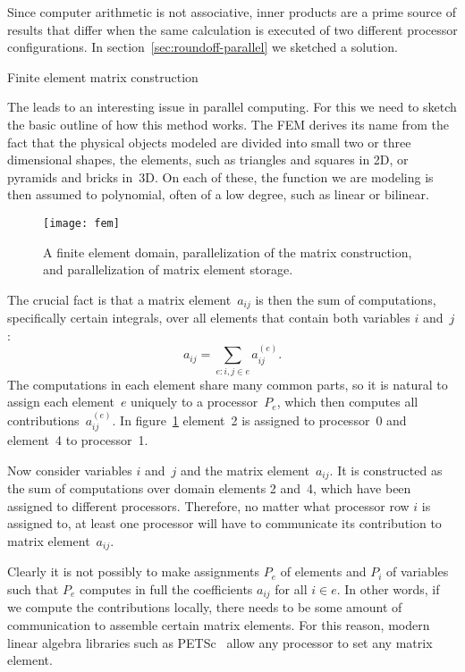 Since computer arithmetic is not associative, inner products are a prime
source of results that differ when the same calculation is executed of
two different processor configurations. In section~\ref{sec:roundoff-parallel}
we sketched a solution.


 {Finite element matrix construction}
\label{sec:fem-assembly}

The  leads to an interesting issue in parallel
computing. For this we need to sketch the basic outline of how this
method works. The \ac{FEM} derives its name from the fact that the
physical objects modeled are divided into small two or three
dimensional shapes, the elements, such as triangles and squares in 2D,
or pyramids and bricks in~3D. On each of these, the function we are
modeling is then assumed to polynomial, often of a low degree, such as
linear or bilinear.

\begin{figure}[ht]
  \texttt{[image: fem]}  
  \caption{A finite element domain, parallelization of the matrix
    construction, and parallelization of matrix element storage.}
  \label{fig:fem-assembly}
\end{figure}

The crucial fact is that a matrix element~$a_{ij}$ is then the sum of
computations, specifically certain integrals, over all elements that
contain both variables $i$ and~$j$:
\[ a_{ij}=\sum_{e\colon i,j\in e} a^{(e)}_{ij}. \]
The computations in each element share many common parts, so it is
natural to assign each element~$e$ uniquely to a processor~$P_e$,
which then computes all contributions~$a^{(e)}_{ij}$. In
figure~\ref{fig:fem-assembly} element~2 is assigned to processor~0
and element~4 to processor~1.

Now consider variables $i$ and~$j$ and the matrix
element~$a_{ij}$.  It is constructed as the sum of computations over
domain elements 2 and~4, which have been assigned to different processors.
Therefore, no matter what processor row $i$ is assigned to, at least
one processor will have to communicate its contribution to matrix
element~$a_{ij}$.

Clearly it is not possibly to make assignments $P_e$ of elements and
$P_i$ of variables such that $P_e$ computes in full the coefficients
$a_{ij}$ for all $i\in e$. In other words, if we compute the
contributions locally, there needs to be some amount of communication to
assemble certain matrix elements.
For this reason,
modern linear algebra libraries such as PETSc~
allow any processor to set any matrix element.

